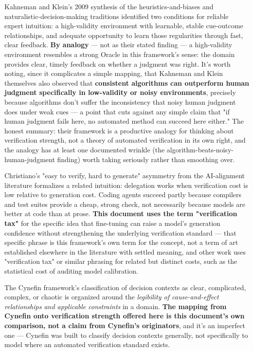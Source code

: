 Kahneman and Klein's 2009 synthesis of the heuristics-and-biases and naturalistic-decision-making traditions identified two conditions for reliable expert intuition: a high-validity environment with learnable, stable cue-outcome relationships, and adequate opportunity to learn those regularities through fast, clear feedback. \textbf{By analogy} --- not as their stated finding --- a high-validity environment resembles a strong Oracle in this framework's sense: the domain provides clear, timely feedback on whether a judgment was right. It's worth noting, since it complicates a simple mapping, that Kahneman and Klein themselves also observed that \textbf{consistent algorithms can outperform human judgment specifically in low-validity or noisy environments}, precisely because algorithms don't suffer the inconsistency that noisy human judgment does under weak cues --- a point that cuts against any simple claim that "if human judgment fails here, no automated method can succeed here either." The honest summary: their framework is a productive analogy for thinking about verification strength, not a theory of automated verification in its own right, and the analogy has at least one documented wrinkle (the algorithm-beats-noisy-human-judgment finding) worth taking seriously rather than smoothing over.

Christiano's "easy to verify, hard to generate" asymmetry from the AI-alignment literature formalizes a related intuition: delegation works when verification cost is low relative to generation cost. Coding agents succeed partly because compilers and test suites provide a cheap, strong check, not necessarily because models are better at code than at prose. \textbf{This document uses the term "verification tax"} for the specific idea that fine-tuning can raise a model's generation confidence without strengthening the underlying verification standard --- that specific phrase is this framework's own term for the concept, not a term of art established elsewhere in the literature with settled meaning, and other work uses "verification tax" or similar phrasing for related but distinct costs, such as the statistical cost of auditing model calibration.

The Cynefin framework's classification of decision contexts as clear, complicated, complex, or chaotic is organized around the \emph{legibility of cause-and-effect relationships and applicable constraints} in a domain. \textbf{The mapping from Cynefin onto verification strength offered here is this document's own comparison, not a claim from Cynefin's originators}, and it's an imperfect one --- Cynefin was built to classify decision contexts generally, not specifically to model where an automated verification standard exists.

